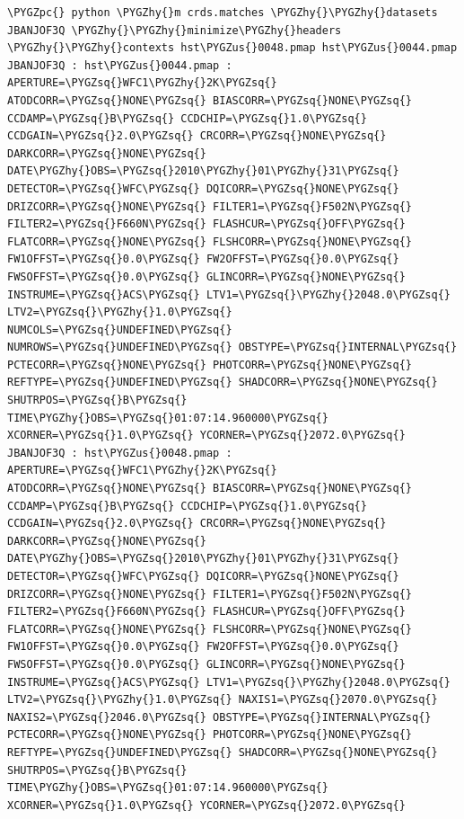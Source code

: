 \documentclass[letterpaper,10pt,english]{sphinxmanual}
\def\PYGZus{\char`\_}
\def\PYGZpc{\char`\%}
\def\PYGZhy{\char`\-}
\def\PYGZsq{\char`\'}
\renewcommand\PYGZsq{\textquotesingle}
\begin{document}
\begin{Verbatim}[commandchars=\\\{\}]
\PYGZpc{} python \PYGZhy{}m crds.matches \PYGZhy{}\PYGZhy{}datasets JBANJOF3Q \PYGZhy{}\PYGZhy{}minimize\PYGZhy{}headers \PYGZhy{}\PYGZhy{}contexts hst\PYGZus{}0048.pmap hst\PYGZus{}0044.pmap
JBANJOF3Q : hst\PYGZus{}0044.pmap : APERTURE=\PYGZsq{}WFC1\PYGZhy{}2K\PYGZsq{} ATODCORR=\PYGZsq{}NONE\PYGZsq{} BIASCORR=\PYGZsq{}NONE\PYGZsq{} CCDAMP=\PYGZsq{}B\PYGZsq{} CCDCHIP=\PYGZsq{}1.0\PYGZsq{} CCDGAIN=\PYGZsq{}2.0\PYGZsq{} CRCORR=\PYGZsq{}NONE\PYGZsq{} DARKCORR=\PYGZsq{}NONE\PYGZsq{} DATE\PYGZhy{}OBS=\PYGZsq{}2010\PYGZhy{}01\PYGZhy{}31\PYGZsq{} DETECTOR=\PYGZsq{}WFC\PYGZsq{} DQICORR=\PYGZsq{}NONE\PYGZsq{} DRIZCORR=\PYGZsq{}NONE\PYGZsq{} FILTER1=\PYGZsq{}F502N\PYGZsq{} FILTER2=\PYGZsq{}F660N\PYGZsq{} FLASHCUR=\PYGZsq{}OFF\PYGZsq{} FLATCORR=\PYGZsq{}NONE\PYGZsq{} FLSHCORR=\PYGZsq{}NONE\PYGZsq{} FW1OFFST=\PYGZsq{}0.0\PYGZsq{} FW2OFFST=\PYGZsq{}0.0\PYGZsq{} FWSOFFST=\PYGZsq{}0.0\PYGZsq{} GLINCORR=\PYGZsq{}NONE\PYGZsq{} INSTRUME=\PYGZsq{}ACS\PYGZsq{} LTV1=\PYGZsq{}\PYGZhy{}2048.0\PYGZsq{} LTV2=\PYGZsq{}\PYGZhy{}1.0\PYGZsq{} NUMCOLS=\PYGZsq{}UNDEFINED\PYGZsq{} NUMROWS=\PYGZsq{}UNDEFINED\PYGZsq{} OBSTYPE=\PYGZsq{}INTERNAL\PYGZsq{} PCTECORR=\PYGZsq{}NONE\PYGZsq{} PHOTCORR=\PYGZsq{}NONE\PYGZsq{} REFTYPE=\PYGZsq{}UNDEFINED\PYGZsq{} SHADCORR=\PYGZsq{}NONE\PYGZsq{} SHUTRPOS=\PYGZsq{}B\PYGZsq{} TIME\PYGZhy{}OBS=\PYGZsq{}01:07:14.960000\PYGZsq{} XCORNER=\PYGZsq{}1.0\PYGZsq{} YCORNER=\PYGZsq{}2072.0\PYGZsq{}
JBANJOF3Q : hst\PYGZus{}0048.pmap : APERTURE=\PYGZsq{}WFC1\PYGZhy{}2K\PYGZsq{} ATODCORR=\PYGZsq{}NONE\PYGZsq{} BIASCORR=\PYGZsq{}NONE\PYGZsq{} CCDAMP=\PYGZsq{}B\PYGZsq{} CCDCHIP=\PYGZsq{}1.0\PYGZsq{} CCDGAIN=\PYGZsq{}2.0\PYGZsq{} CRCORR=\PYGZsq{}NONE\PYGZsq{} DARKCORR=\PYGZsq{}NONE\PYGZsq{} DATE\PYGZhy{}OBS=\PYGZsq{}2010\PYGZhy{}01\PYGZhy{}31\PYGZsq{} DETECTOR=\PYGZsq{}WFC\PYGZsq{} DQICORR=\PYGZsq{}NONE\PYGZsq{} DRIZCORR=\PYGZsq{}NONE\PYGZsq{} FILTER1=\PYGZsq{}F502N\PYGZsq{} FILTER2=\PYGZsq{}F660N\PYGZsq{} FLASHCUR=\PYGZsq{}OFF\PYGZsq{} FLATCORR=\PYGZsq{}NONE\PYGZsq{} FLSHCORR=\PYGZsq{}NONE\PYGZsq{} FW1OFFST=\PYGZsq{}0.0\PYGZsq{} FW2OFFST=\PYGZsq{}0.0\PYGZsq{} FWSOFFST=\PYGZsq{}0.0\PYGZsq{} GLINCORR=\PYGZsq{}NONE\PYGZsq{} INSTRUME=\PYGZsq{}ACS\PYGZsq{} LTV1=\PYGZsq{}\PYGZhy{}2048.0\PYGZsq{} LTV2=\PYGZsq{}\PYGZhy{}1.0\PYGZsq{} NAXIS1=\PYGZsq{}2070.0\PYGZsq{} NAXIS2=\PYGZsq{}2046.0\PYGZsq{} OBSTYPE=\PYGZsq{}INTERNAL\PYGZsq{} PCTECORR=\PYGZsq{}NONE\PYGZsq{} PHOTCORR=\PYGZsq{}NONE\PYGZsq{} REFTYPE=\PYGZsq{}UNDEFINED\PYGZsq{} SHADCORR=\PYGZsq{}NONE\PYGZsq{} SHUTRPOS=\PYGZsq{}B\PYGZsq{} TIME\PYGZhy{}OBS=\PYGZsq{}01:07:14.960000\PYGZsq{} XCORNER=\PYGZsq{}1.0\PYGZsq{} YCORNER=\PYGZsq{}2072.0\PYGZsq{}
\end{Verbatim}
\end{document}
